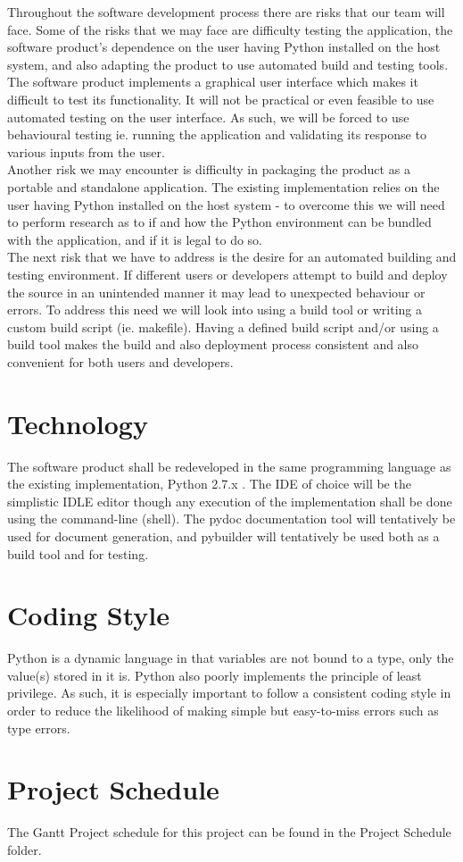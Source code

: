 \documentclass{article}
\begin{document}
\noindent Throughout the software development process there are risks that our
team will face. Some of the risks that we may face are difficulty testing the
application, the software product's dependence on the user having Python
installed on the host system, and also adapting the product to use automated
build and testing tools.\\The software product implements a graphical user
interface which makes it difficult to test its functionality. It will not be
practical or even feasible to use automated testing on the user interface. As
such, we will be forced to use behavioural testing ie. running the application
and validating its response to various inputs from the user. \\Another risk we
may encounter is difficulty in packaging the product as a portable and
standalone application. The existing implementation relies on the user having
Python installed on the host system - to overcome this we will need to perform
research as to if and how the Python environment can be bundled with the
application, and if it is legal to do so.\\The next risk that we have to address
is the desire for an automated building and testing environment. If different
users or developers attempt to build and deploy the source in an unintended
manner it may lead to unexpected behaviour or errors. To address this need we
will look into using a build tool or writing a custom build script (ie.
makefile). Having a defined build script and/or using a build tool makes the
build and also deployment process consistent and also convenient for both users
and developers.


\section{Technology} \noindent The software product shall be redeveloped in the
same programming language as the existing implementation, Python 2.7.x . The IDE
of choice will be the simplistic IDLE editor though any execution of the
implementation shall be done using the command-line (shell). The pydoc
documentation tool will tentatively be used for document generation, and
pybuilder will tentatively be used both as a build tool and for testing.

\section{Coding Style} 

\noindent Python is a dynamic language in that variables are not bound to a
type, only the value(s) stored in it is. Python also poorly implements the
principle of least privilege. As such, it is especially important to follow a
consistent coding style in order to reduce the likelihood of making simple but
easy-to-miss errors such as type errors.

\section{Project Schedule} 

\noindent The Gantt Project schedule for this project can be found in the
Project Schedule folder.
\end{document}
